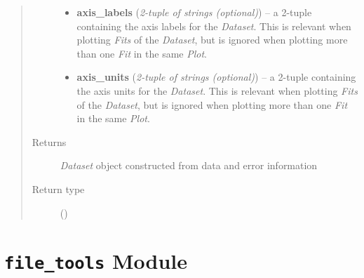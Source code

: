 \documentclass[a4paper,10pt,english]{sphinxmanual}
\begin{document}
\begin{fulllineitems}
\begin{quote}
\begin{description}
\begin{itemize}
\item {} 
\textbf{axis\_labels} (\emph{2-tuple of strings (optional)}) --
a 2-tuple containing the axis labels for the \emph{Dataset}. This is
relevant when plotting \emph{Fits} of the \emph{Dataset}, but is ignored when
plotting more than one \emph{Fit} in the same \emph{Plot}.

\item {} 
\textbf{axis\_units} (\emph{2-tuple of strings (optional)}) --
a 2-tuple containing the axis units for the \emph{Dataset}. This is
relevant when plotting \emph{Fits} of the \emph{Dataset}, but is ignored when
plotting more than one \emph{Fit} in the same \emph{Plot}.

\end{itemize}

\item[{Returns}] \leavevmode
\emph{Dataset} object constructed from data and error information

\item[{Return type}] \leavevmode
{\hyperref[index:kafe.dataset.Dataset]{\emph{}}} ()

\end{description}\end{quote}

\end{fulllineitems}



\section{\texttt{file\_tools} Module}
\label{index:file-tools-module}\label{index:module-kafe.file_tools}\label{index:module-file_tools}
\end{document}
